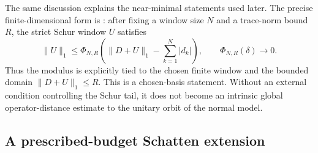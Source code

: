 The same discussion explains the near-minimal statements used later.  The
precise finite-dimensional form is
: after fixing a window size
\(N\) and a trace-norm bound \(R\), the strict Schur window
\(U\) satisfies
\[
  \|U\|_1\le
  \Phi_{N,R}\left(
    \|D+U\|_1-
    \sum_{k=1}^N |d_k|
  \right),
  \qquad
  \Phi_{N,R}(\delta)\to0.
\]
Thus the modulus is explicitly tied to the chosen finite window and the bounded
domain \(\|D+U\|_1\le R\).  This is a chosen-basis statement.  Without an
external condition controlling the Schur tail, it does not become an intrinsic
global operator-distance estimate to the unitary orbit of the normal model.

\subsection{A prescribed-budget Schatten extension}

